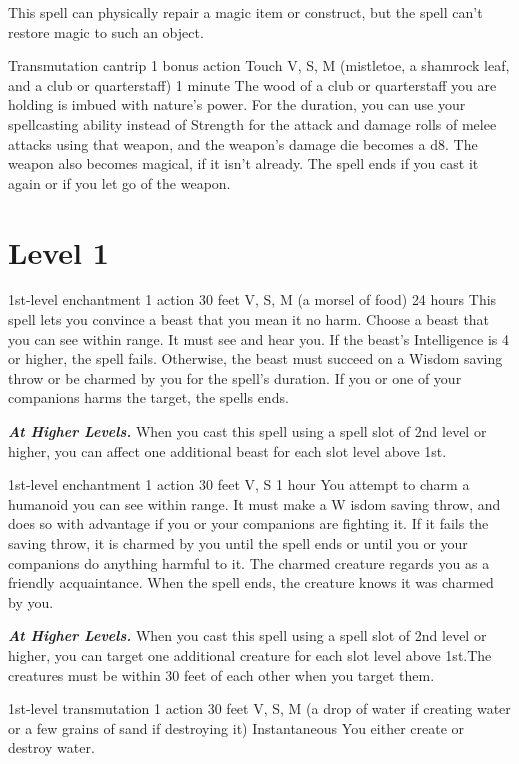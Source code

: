 \documentclass[10pt,twoside,twocolumn,openany]{book}
\newcommand\impact[1]{
	\textbf{\textit{#1}}
}
\begin{document}
This spell can physically repair a magic item or construct, but the spell can't restore magic to such an object.

{Transmutation cantrip}
{\color{bonusaction} 1 bonus action}
{Touch}
{V, S, M  (mistletoe, a shamrock leaf, and a club or quarterstaff)}
{1 minute}
%
The wood of a club or quarterstaff you are holding is imbued with nature's power. For the duration, you can use your spellcasting ability instead of Strength for the attack and damage rolls of melee attacks using that weapon, and the weapon's damage die becomes a d8. The weapon also becomes magical, if it isn't already. The spell ends if you cast it again or if you let go of the weapon.

\clearpage
\section{Level 1}
{1st-level enchantment}
{\color{action} 1 action}
{30 feet}
{V, S, M (a morsel of food)}
{24 hours}
This spell lets you convince a beast that you mean it no harm. Choose a beast that you can see within range. It must see and hear you. If the beast's Intelligence is 4 or higher, the spell fails. Otherwise, the beast must succeed on a Wisdom saving throw or be charmed by you for the spell's duration. If you or one of your companions harms the target, the spells ends.

\impact{At Higher Levels.} When you cast this spell using a spell slot of 2nd level or higher, you can affect one additional beast for each slot level above 1st.

{1st-level enchantment}
{\color{action} 1 action}
{30 feet}
{V, S}
{1 hour}
%
You attempt to charm a humanoid you can see within range. It must make a W isdom saving throw, and does so with advantage if you or your companions are fighting it. If it fails the saving throw, it is charmed by you until the spell ends or until you or your companions do anything harmful to it. The charmed creature regards you as a friendly acquaintance. When the spell ends, the creature knows it was charmed by you.

\impact{At Higher Levels.} When you cast this spell using a spell slot of 2nd level or higher, you can target one additional creature for each slot level above 1st.The creatures must be within 30 feet of each other when you target them.

\newpage
{}
{1st-level transmutation}
{\color{action} 1 action}
{30 feet}
{V, S, M (a drop of water if creating water or a few grains of sand if destroying it)}
{Instantaneous}
%
You either create or destroy water.
\end{document}
